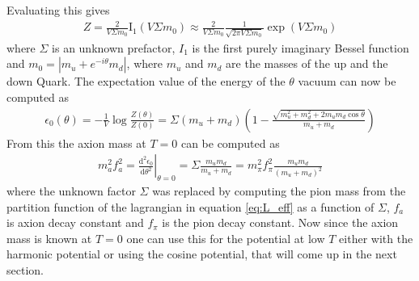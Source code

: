 \documentclass[a4paper, 12pt]{article}
\newcommand{\diff}{\mathrm{d}}
\begin{document}
Evaluating this gives \cite[Sec. VIII, Eq. 8.15]{Leutwyler:1992yt}
\begin{align*}
   Z  =  \frac{2}{V \Sigma m_0} \mathrm{I}_1 (V \Sigma m_0)
   \approx \frac{2}{V \Sigma m_0} \frac{1}{\sqrt{2 \pi V \Sigma m_0}} \exp (V \Sigma m_0)
\end{align*}
where $\Sigma$ is an unknown prefactor, $I_1$ is the first purely imaginary Bessel function and $m_0 = |m_u + e^{- i \theta} m_d|$,
where $m_u$ and $m_d$ are the masses of the up and the down Quark.
The expectation value of the energy of the $\theta$ vacuum can now be computed as \cite[Sec. IX, Eq. 9.5]{Leutwyler:1992yt}
\begin{align*}
   \epsilon_0(\theta) = - \frac{1}{V} \log \frac{Z(\theta)}{Z(0)} =
   \Sigma (m_u + m_d) \left( 1 - \frac{\sqrt{m_u^2 + m_d^2 + 2 m_u m_d \cos \theta}}{m_u + m_d}\right)
\end{align*}
From this the axion mass at $T = 0$ can be computed as \cite[Sec. IV, Eq. 9.7]{Leutwyler:1992yt}
\begin{align}
    \label{eq:axion_mass_at_zero_T}
    m_a^2 f_a^2 =
    \left. \frac{\diff^2 \epsilon_0}{\diff \theta^2} \right|_{\theta = 0} = \Sigma \frac{m_u m_d}{m_u + m_d}
    = m_\pi^2 f_\pi^2 \frac{m_u m_d}{(m_u + m_d)^2}
\end{align}
where the unknown factor $\Sigma$ was replaced by computing the pion mass from the partition function of the lagrangian in equation \ref{eq:L_eff} as a function of $\Sigma$,
$f_a$ is axion decay constant and $f_\pi$ is the pion decay constant.
Now since the axion mass is known at $T = 0$ one can use this
for the potential at low $T$ either with the harmonic potential
or using the cosine potential, that will come up in the next
section.
\end{document}
